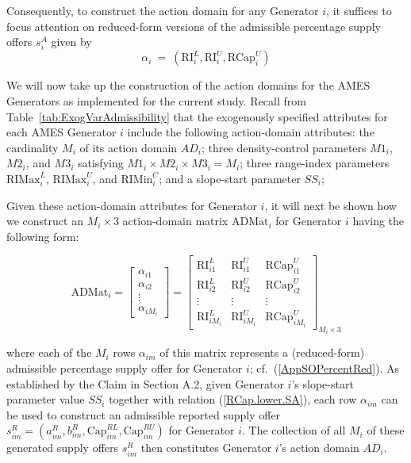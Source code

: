 \documentclass[12pt]{article}
\begin{document}
\smallskip
\noindent
Consequently, to construct the action domain for any Generator $i$, it suffices to focus attention on reduced-form versions of the admissible percentage supply offers $s^A_i$ given by       
                      \begin{equation}  \label{AppSOPercentRed}
	\alpha_i ~ = ~(\mbox{RI}^L_i, \mbox{RI}^U_i, \mbox{RCap}^U_i)
                    \end{equation}

\smallskip
We will now take up the construction of the action domains for the AMES Generators as implemented for the current study.  Recall from Table~\ref{tab:ExogVarAdmissibility} that the exogenously specified attributes for each AMES Generator $i$ include the following action-domain attributes: 
the cardinality $M_i$ of its action domain $AD_i$; 
three density-control parameters $M1_i$, $M2_i$, and $M3_i$ satisfying $M1_i\times M2_i \times M3_i = M_i$; three range-index parameters $\mbox{RIMax}^L_i$, $\mbox{RIMax}^U_i$, and $\mbox{RIMin}^C_i$;
and a slope-start parameter $SS_i$; 

Given these action-domain attributes for Generator $i$, it will next be shown how we construct an $M_i\times 3$ 
action-domain matrix $\mbox{ADMat}_i$ for Generator $i$ having the following form: 

\begin{equation}
	 \mbox{ADMat}_i = \left[ \begin{array}{c}
						 \alpha_{i1} \\
						 \alpha_{i2} \\
						    \vdots \\
						 \alpha_{iM_i} \end{array} \right] =
			\left[ \begin{array}{cccc}
						 \mbox{RI}_{i1}^L & \mbox{RI}_{i1}^U & \mbox{RCap}_{i1}^U \\
						 \mbox{RI}_{i2}^L & \mbox{RI}_{i2}^U & \mbox{RCap}_{i2}^U \\
						    \vdots & \vdots    & \vdots      \\
					   \mbox{RI}_{iM_i}^L & \mbox{RI}_{iM_i}^U & \mbox{RCap}_{iM_i}^U   \end{array} \right]_{M_i\times 3}	
\end{equation}

\medskip
\noindent
where each of the $M_i$ rows $\alpha_{im}$ of this matrix represents a (reduced-form) admissible percentage supply offer for Generator $i$; cf.\ (\ref{AppSOPercentRed}). As established by the Claim in Section A.2, given Generator $i$'s slope-start parameter value $SS_i$ together with relation (\ref{RCap.lower.SA}), each row $\alpha_{im}$ can be used to construct an admissible reported supply offer $s_{im}^R = 
(a_{im}^R, b_{im}^R, \mbox{Cap}^{RL}_{im}, \mbox{Cap}^{RU}_{im})$ for Generator $i$.  The collection of all $M_i$ of these generated supply offers $s^R_{im}$ then constitutes Generator $i$'s action domain $AD_i$.
\end{document}
